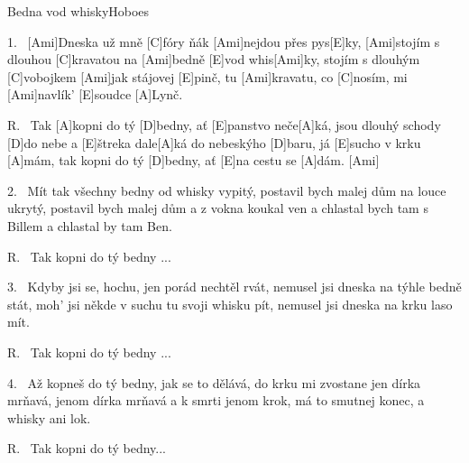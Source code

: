 \begin{song}{Bedna vod whisky}{Hoboes}

\begin{xverse}{1.~}
[Ami]Dneska už mně [C]fóry ňák [Ami]nejdou přes pys[E]ky,
[Ami]stojím s dlouhou [C]kravatou na [Ami]bedně [E]vod whis[Ami]ky,
stojím s dlouhým [C]vobojkem [Ami]jak stájovej [E]pinč,
tu [Ami]kravatu, co [C]nosím, mi [Ami]navlík' [E]soudce [A]Lynč.
\end{xverse}


\begin{xverse}{R.~}
Tak [A]kopni do tý [D]bedny, ať [E]panstvo neče[A]ká,
jsou dlouhý schody [D]do nebe a [E]{}štreka dale[A]ká
do nebeskýho [D]baru, já [E]sucho v krku [A]mám,
tak kopni do tý [D]bedny, ať [E]na cestu se [A]dám. [Ami]{}
\end{xverse}


\begin{xverse}{2.~}
Mít tak všechny bedny od whisky vypitý,
postavil bych malej dům na louce ukrytý,
postavil bych malej dům a z vokna koukal ven
a chlastal bych tam s Billem a chlastal by tam Ben.
\end{xverse}


\begin{xverse}{R.~}
Tak kopni do tý bedny ...
\end{xverse}


\begin{xverse}{3.~}
Kdyby jsi se, hochu, jen porád nechtěl rvát,
nemusel jsi dneska na týhle bedně stát,
moh' jsi někde v suchu tu svoji whisku pít,
nemusel jsi dneska na krku laso mít.
\end{xverse}


\begin{xverse}{R.~}
Tak kopni do tý bedny ...
\end{xverse}


\begin{xverse}{4.~}
Až kopneš do tý bedny, jak se to dělává,
do krku mi zvostane jen dírka mrňavá,
jenom dírka mrňavá a k smrti jenom krok,
má to smutnej konec, a whisky ani lok.
\end{xverse}


\begin{xverse}{R.~}
Tak kopni do tý bedny...
\end{xverse}


\end{song}

